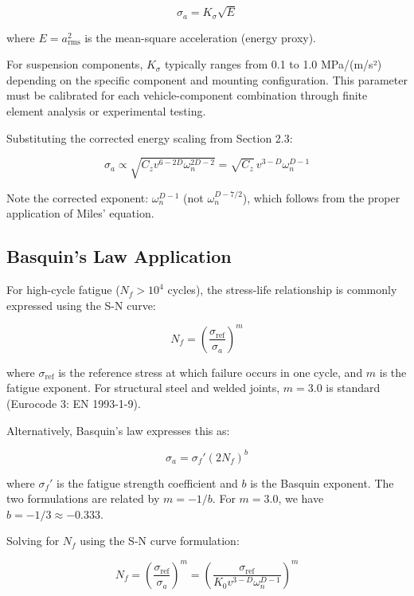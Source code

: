 \documentclass[11pt]{article}
\begin{document}
\begin{equation}
\sigma_a = K_\sigma \sqrt{E}
\end{equation}

where $E = a_{\text{rms}}^2$ is the mean-square acceleration (energy proxy).

For suspension components, $K_\sigma$ typically ranges from 0.1 to 1.0 MPa/(m/s²) depending on the specific component and mounting configuration. This parameter must be calibrated for each vehicle-component combination through finite element analysis or experimental testing.

Substituting the corrected energy scaling from Section 2.3:

\begin{equation}
\sigma_a \propto \sqrt{C_z v^{6-2D} \omega_n^{2D-2}} = \sqrt{C_z} \, v^{3-D} \omega_n^{D-1}
\end{equation}

Note the corrected exponent: $\omega_n^{D-1}$ (not $\omega_n^{D-7/2}$), which follows from the proper application of Miles' equation.

\subsection{Basquin's Law Application}

For high-cycle fatigue ($N_f > 10^4$ cycles), the stress-life relationship is commonly expressed using the S-N curve:

\begin{equation}
N_f = \left(\frac{\sigma_{\text{ref}}}{\sigma_a}\right)^m
\end{equation}

where $\sigma_{\text{ref}}$ is the reference stress at which failure occurs in one cycle, and $m$ is the fatigue exponent. For structural steel and welded joints, $m = 3.0$ is standard (Eurocode 3: EN 1993-1-9).

Alternatively, Basquin's law expresses this as:

\begin{equation}
\sigma_a = \sigma_f' (2N_f)^b
\end{equation}

where $\sigma_f'$ is the fatigue strength coefficient and $b$ is the Basquin exponent. The two formulations are related by $m = -1/b$. For $m = 3.0$, we have $b = -1/3 \approx -0.333$.

Solving for $N_f$ using the S-N curve formulation:

\begin{equation}
N_f = \left(\frac{\sigma_{\text{ref}}}{\sigma_a}\right)^m = \left(\frac{\sigma_{\text{ref}}}{K_0 v^{3-D} \omega_n^{D-1}}\right)^m
\end{equation}
\end{document}
